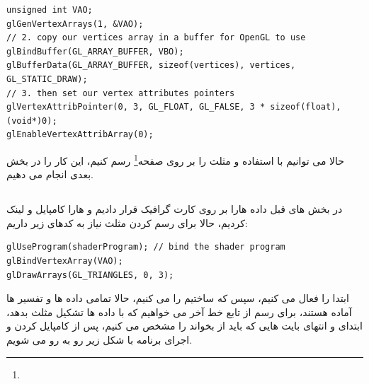 \documentclass[a4paper, 12pt]{report}
\newcommand{\lrit}[1]{\lr{\textit{#1}}}
\begin{document}
    \begin{LTR}
    \small
        \begin{lstlisting}[style=C++Style,caption=\lrit{link vertex attribute to vertex data}]
unsigned int VAO;
glGenVertexArrays(1, &VAO);
// 2. copy our vertices array in a buffer for OpenGL to use
glBindBuffer(GL_ARRAY_BUFFER, VBO);
glBufferData(GL_ARRAY_BUFFER, sizeof(vertices), vertices, GL_STATIC_DRAW);
// 3. then set our vertex attributes pointers
glVertexAttribPointer(0, 3, GL_FLOAT, GL_FALSE, 3 * sizeof(float), (void*)0);
glEnableVertexAttribArray(0);

        \end{lstlisting}
    \end{LTR}
    \normalsize
    \vspace*{0.3cm}


    حالا می توانیم با استفاده  و  مثلث را بر روی صفحه\footnote{} رسم کنیم، این کار را در بخش بعدی انجام می دهیم.

\newpage
\subsection{}
\noindent
\normalsize
    در بخش های قبل داده هارا بر روی کارت گرافیک قرار دادیم و  هارا کامپایل و لینک کردیم، حالا برای رسم کردن مثلث نیاز به کدهای زیر داریم:

    \begin{LTR}
    \small
        \begin{lstlisting}[style=C++Style,caption=\lrit{link vertex attribute to vertex data}]
glUseProgram(shaderProgram); // bind the shader program
glBindVertexArray(VAO);
glDrawArrays(GL_TRIANGLES, 0, 3);
        \end{lstlisting}
    \end{LTR}
    \normalsize
    \vspace*{0.3cm}

    ابتدا  را فعال می کنیم، سپس  که ساختیم را  می کنیم، حالا تمامی داده ها و تفسیر ها آماده هستند، برای رسم از تابع خط آخر می خواهیم که با داده ها تشکیل مثلث بدهد، ابتدای و انتهای بایت هایی که باید از  بخواند را مشخص می کنیم، پس از کامپایل کردن و اجرای برنامه با شکل زیر رو به رو می شویم.
\end{document}

